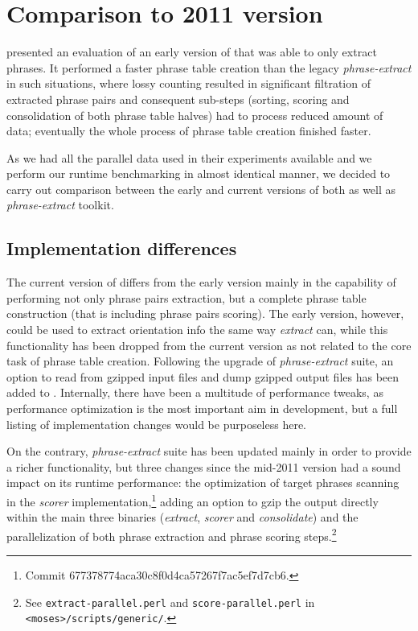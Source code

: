 \section{Comparison to 2011 version}
\label{sec:cu-bojar-results}

\citet{przywara:eppex} presented an evaluation of an early version of \eppex{}
that was able to only extract phrases. It performed a faster phrase
table creation than the legacy \emph{phrase-extract} in such situations,
where lossy counting resulted in significant filtration of extracted phrase
pairs and consequent sub-steps (sorting, scoring and consolidation of both
phrase table halves) had to process reduced amount of data;
eventually the whole process of phrase table creation finished faster.

As we had all the parallel data used in their experiments available and
we perform our runtime benchmarking in almost identical manner,
we decided to carry out comparison between the early and current versions of
both \eppex{} as well as \emph{phrase-extract} toolkit.

\subsection{Implementation differences}

The current version of \eppex{} differs from the early version mainly in the
capability of performing not only phrase pairs extraction, but a complete
phrase table construction (that is including phrase pairs scoring).
The early version, however, could be used to extract orientation info
the same way \emph{extract} can, while this functionality has been dropped
from the current version as not related to the core task of phrase table creation.
Following the upgrade of \emph{phrase-extract} suite, an option to read from
gzipped input files and dump gzipped output files has been added to \eppex{}.
Internally, there have been a multitude of performance tweaks,
as performance optimization is the most important aim in \eppex{} development,
but a full listing of implementation changes would be purposeless here.

On the contrary, \emph{phrase-extract} suite has been updated mainly in order to
provide a richer functionality, but three changes since the mid-2011 version
had a sound impact on its runtime performance: the optimization of target phrases
scanning in the \emph{scorer} implementation,\footnote{Commit 677378774aca30c8f0d4ca57267f7ac5ef7d7cb6.}
adding an option to gzip the output directly within the main three binaries
(\emph{extract}, \emph{scorer} and \emph{consolidate})
and the parallelization of both phrase extraction and phrase scoring
steps.\footnote{See \texttt{extract-parallel.perl} and \texttt{score-parallel.perl}
in \texttt{<moses>/scripts/generic/}.}

